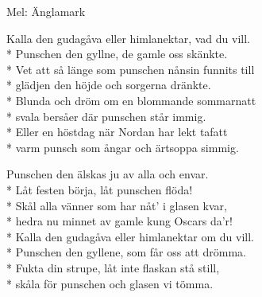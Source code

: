 \begin{SongText}[Änglapunschen]
    \begin{SongInfo}
        Mel: Änglamark
    \end{SongInfo}
    \begin{SongVerse}
        Kalla den gudagåva eller himlanektar, vad du vill.\\*%
        Punschen den gyllne, de gamle oss skänkte.\\*%
        Vet att så länge som punschen nånsin funnits till\\*%
        glädjen den höjde och sorgerna dränkte.\\*%
        Blunda och dröm om en blommande sommarnatt\\*%
        svala bersåer där punschen står immig.\\*%
        Eller en höstdag när Nordan har lekt tafatt\\*%
        varm punsch som ångar och ärtsoppa simmig.
    \end{SongVerse}
    \begin{SongVerse}
        Punschen den älskas ju av alla och envar.\\*%
        Låt festen börja, låt punschen flöda!\\*%
        Skål alla vänner som har nåt' i glasen kvar,\\*%
        hedra nu minnet av gamle kung Oscars da'r!\\*%
        Kalla den gudagåva eller himlanektar om du vill.\\*%
        Punschen den gyllene, som får oss att drömma.\\*%
        Fukta din strupe, låt inte flaskan stå still,\\*%
        skåla för punschen och glasen vi tömma.
    \end{SongVerse}
\end{SongText}